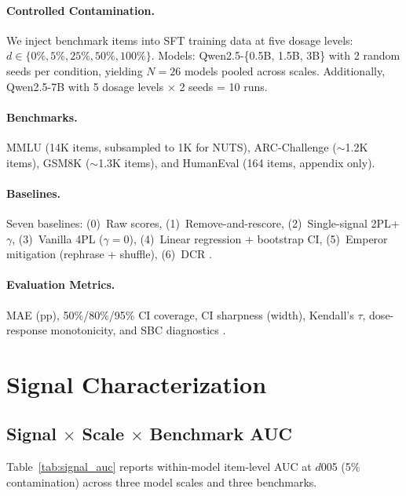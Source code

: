 \documentclass[11pt,a4paper]{article}
\begin{document}
\paragraph{Controlled Contamination.}
We inject benchmark items into SFT training data at five dosage levels: $d \in \{0\%, 5\%, 25\%, 50\%, 100\%\}$.
Models: Qwen2.5-\{0.5B, 1.5B, 3B\} with 2 random seeds per condition, yielding $N=26$ models pooled across scales.
Additionally, Qwen2.5-7B with 5 dosage levels $\times$ 2 seeds = 10 runs.

\paragraph{Benchmarks.}
MMLU (14K items, subsampled to 1K for NUTS), ARC-Challenge ($\sim$1.2K items), GSM8K ($\sim$1.3K items), and HumanEval (164 items, appendix only).

\paragraph{Baselines.}
Seven baselines: (0)~Raw scores, (1)~Remove-and-rescore, (2)~Single-signal 2PL+$\gamma$, (3)~Vanilla 4PL ($\gamma=0$), (4)~Linear regression + bootstrap CI, (5)~Emperor mitigation (rephrase + shuffle), (6)~DCR \citep{oren2024proving}.

\paragraph{Evaluation Metrics.}
MAE (pp), 50\%/80\%/95\% CI coverage, CI sharpness (width), Kendall's $\tau$, dose-response monotonicity, and SBC diagnostics \citep{talts2018validating}.

\section{Signal Characterization}
\label{sec:signal_char}

\subsection{Signal $\times$ Scale $\times$ Benchmark AUC}

Table~\ref{tab:signal_auc} reports within-model item-level AUC at $d$005 (5\% contamination) across three model scales and three benchmarks.
\end{document}
